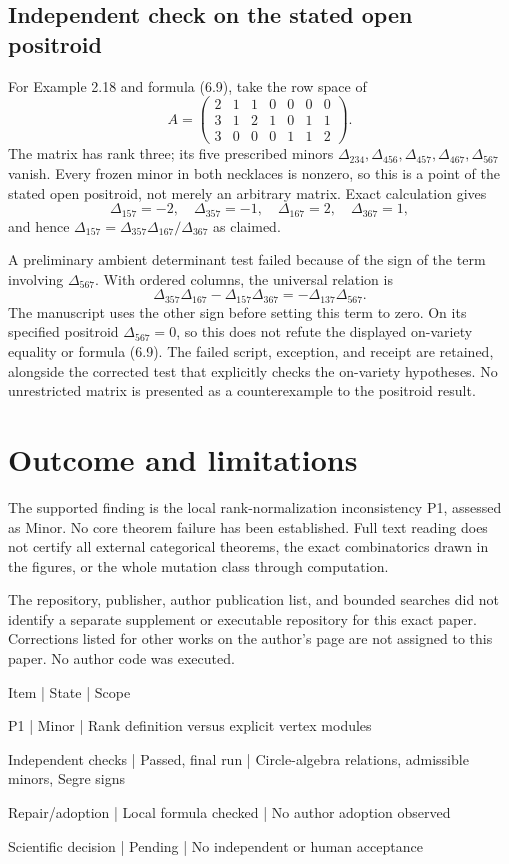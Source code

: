 \documentclass[10pt]{article}
\begin{document}
\subsection*{Independent check on the stated open positroid}
For Example 2.18 and formula (6.9), take the row space of \[A=\begin{pmatrix}
2&1&1&0&0&0&0\\
3&1&2&1&0&1&1\\
3&0&0&0&1&1&2
\end{pmatrix}.\] The matrix has rank three; its five prescribed minors \(\Delta_{234},\Delta_{456},\Delta_{457},\Delta_{467},\Delta_{567}\) vanish. Every frozen minor in both necklaces is nonzero, so this is a point of the stated open positroid, not merely an arbitrary matrix. Exact calculation gives \[\Delta_{157}=-2,\quad \Delta_{357}=-1,\quad
\Delta_{167}=2,\quad\Delta_{367}=1,\] and hence \(\Delta_{157}=\Delta_{357}\Delta_{167}/\Delta_{367}\) as claimed.\par
A preliminary ambient determinant test failed because of the sign of the term involving \(\Delta_{567}\). With ordered columns, the universal relation is \[\Delta_{357}\Delta_{167}-\Delta_{157}\Delta_{367}
=-\Delta_{137}\Delta_{567}.\] The manuscript uses the other sign before setting this term to zero. On its specified positroid \(\Delta_{567}=0\), so this does not refute the displayed on-variety equality or formula (6.9). The failed script, exception, and receipt are retained, alongside the corrected test that explicitly checks the on-variety hypotheses. No unrestricted matrix is presented as a counterexample to the positroid result.\par
\section*{Outcome and limitations}
The supported finding is the local rank-normalization inconsistency P1, assessed as Minor. No core theorem failure has been established. Full text reading does not certify all external categorical theorems, the exact combinatorics drawn in the figures, or the whole mutation class through computation.\par
The repository, publisher, author publication list, and bounded searches did not identify a separate supplement or executable repository for this exact paper. Corrections listed for other works on the author’s page are not assigned to this paper. No author code was executed.\par
Item | State | Scope\par
P1 | Minor | Rank definition versus explicit vertex modules\par
Independent checks | Passed, final run | Circle-algebra relations, admissible minors, Segre signs\par
Repair/adoption | Local formula checked | No author adoption observed\par
Scientific decision | Pending | No independent or human acceptance\par
\end{document}
